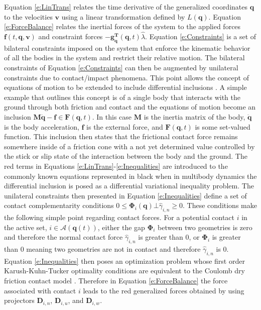 \documentclass[12pt,onecolumn]{report}
\begin{document}
Equation \ref{e:LinTrans} relates the time derivative of the generalized coordinates $\boldsymbol{q}$ to the velocities $\boldsymbol{v}$ using a linear transformation defined by $L\left(\boldsymbol{q}\right)$. Equation \ref{e:ForceBalance} relates the inertial forces of the system to the applied forces $\boldsymbol{f}\left(t,\boldsymbol{q},\boldsymbol{v}\right)$ and constraint forces $- \boldsymbol{g^T_q} \left(\boldsymbol{q},t\right)\hat{\lambda}$. Equation \ref{e:Constraints} is a set of bilateral constraints imposed on the system that enforce the kinematic behavior of all the bodies in the system and restrict their relative motion. The bilateral constraints of Equation \ref{e:Constraints} can then be augmented by unilateral constraints due to contact/impact phenomena. This point allows the concept of equations of motion to be extended to include differential inclusions \cite{filippov88}. A simple example that outlines this concept is of a single body that interacts with the ground through both friction and contact and the equations of motion become an inclusion $\boldsymbol{M\ddot{q}}-\boldsymbol{f}\in\boldsymbol{F}\left(\boldsymbol{q},t\right)$. In this case $\boldsymbol{M}$ is the inertia matrix of the body,  $\boldsymbol{\ddot{q}}$ is the body acceleration,  $\boldsymbol{f}$ is the external force, and $\boldsymbol{F}\left(\boldsymbol{q},t\right)$ is some set-valued function. This inclusion then states that the frictional contact force remains somewhere inside of a friction cone with a not yet determined value controlled by the stick or slip state of the interaction between the body and the ground. The red terms in Equations \ref{e:LinTrans}-\ref{e:Inequalities} are introduced to the commonly known equations represented in black when in multibody dynamics the differential inclusion is posed as a differential variational inequality problem. The unilateral constraints then presented in Equation \ref{e:Inequalities} define a set of contact complementarity conditions $0\le\boldsymbol{\Phi}_i \left(\boldsymbol{q}\right) \bot \hat\gamma_{i,n}  \ge 0$. These conditions make the following simple point regarding contact forces. For a potential contact $i$ in the active set, $i \in \mathcal{A}\left(\boldsymbol{q}\left(t\right)\right)$, either the gap $\boldsymbol{\Phi}_i$ between two geometries is zero and therefore the normal contact force $\hat\gamma_{i,n}$ is greater than $0$, or $\boldsymbol{\Phi}_i$ is greater than $0$ meaning two geometries are not in contact and therefore $\hat\gamma_{i,n}$ is $0$. Equation \ref{e:Inequalities} then poses an optimization problem whose first order Karush-Kuhn-Tucker optimality conditions are equivalent to the Coulomb dry friction contact model \cite{st00}. Therefore in Equation \ref{e:ForceBalance} the force associated with contact $i$ leads to the red generalized forces obtained by using projectors $\boldsymbol{D}_{i,n}$, $\boldsymbol{D}_{i,u}$, and $\boldsymbol{D}_{i,w}$.
\end{document}
